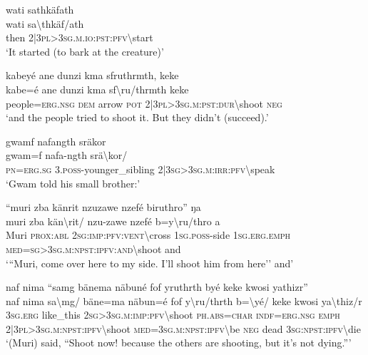 \ea\label{ex:1:a3558}
wati sathkäfath\\
\gll wati	sa{\textbackslash}thkäf/ath\\
     then	2|3\textsc{pl}>3\textsc{sg}.\textsc{m}.\textsc{io}:\textsc{pst}:\textsc{pfv}{\textbackslash}start\\
\glt `It started (to bark at the creature)'
\z

\ea\label{ex:1:a3559}
kabeyé ane dunzi kma sfruthrmth, keke\\
\gll kabe=é	ane	dunzi	kma	sf{\textbackslash}ru/thrmth	keke\\
     people=\textsc{erg}.\textsc{nsg}	\textsc{dem}	arrow	\textsc{pot}	2|3\textsc{pl}>3\textsc{sg}.\textsc{m}:\textsc{pst}:\textsc{dur}{\textbackslash}shoot	\textsc{neg}\\
\glt `and the people tried to shoot it. But they didn't (succeed).'
\z

\ea\label{ex:1:a3560}
gwamf nafangth sräkor\\
\gll gwam=f	nafa-ngth	srä{\textbackslash}kor/\\
     \textsc{pn}=\textsc{erg}.\textsc{sg}	3.\textsc{poss}-younger\_sibling	2|3\textsc{sg}>3\textsc{sg}.\textsc{m}:\textsc{irr}:\textsc{pfv}{\textbackslash}speak\\
\glt `Gwam told his small brother:'
\z

\ea\label{ex:1:a3561}
``muri zba känrit nzuzawe nzefé biruthro'' ŋa\\
\gll muri	zba	kän{\textbackslash}rit/	nzu-zawe	nzefé	b=y{\textbackslash}ru/thro	a\\
     Muri	\textsc{prox}:\textsc{abl}	2\textsc{sg}:\textsc{imp}:\textsc{pfv}:\textsc{vent}{\textbackslash}cross	1\textsc{sg}.\textsc{poss}-side	1\textsc{sg}.\textsc{erg}.\textsc{emph}	\textsc{med}=\textsc{sg}>3\textsc{sg}.\textsc{m}:\textsc{npst}:\textsc{ipfv}:\textsc{and}{\textbackslash}shoot	and\\
\glt `{``}Muri, come over here to my side. I'll shoot him from here'' and'
\z

\newpage
\ea\label{ex:1:a3565}
naf nima ``samg bänema näbuné fof yruthrth byé keke kwosi yathizr''\\
\gll naf	nima	sa{\textbackslash}mg/	bäne=ma	näbun=é	fof	y{\textbackslash}ru/thrth	b={\textbackslash}yé/	keke	kwosi	ya{\textbackslash}thiz/r\\
     3\textsc{sg}.\textsc{erg}	like\_this	2\textsc{sg}>3\textsc{sg}.\textsc{m}:\textsc{imp}:\textsc{pfv}{\textbackslash}shoot	\textsc{ph}.\textsc{abs}=\textsc{char}	\textsc{indf}=\textsc{erg}.\textsc{nsg}	\textsc{emph}	2|3\textsc{pl}>3\textsc{sg}.\textsc{m}:\textsc{npst}:\textsc{ipfv}{\textbackslash}shoot	\textsc{med}=3\textsc{sg}.\textsc{m}:\textsc{npst}:\textsc{ipfv}{\textbackslash}be	\textsc{neg}	dead	3\textsc{sg}:\textsc{npst}:\textsc{ipfv}{\textbackslash}die\\
\glt `(Muri) said, ``Shoot now! because the others are shooting, but it's not dying.'''
\z

